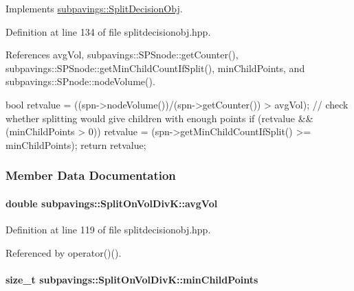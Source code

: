 \-Implements \hyperlink{classsubpavings_1_1SplitDecisionObj_aa1bd2caa4a7bc2890f0c7c7edc4ded4f}{subpavings\-::\-Split\-Decision\-Obj}.



\-Definition at line 134 of file splitdecisionobj.\-hpp.



\-References avg\-Vol, subpavings\-::\-S\-P\-Snode\-::get\-Counter(), subpavings\-::\-S\-P\-Snode\-::get\-Min\-Child\-Count\-If\-Split(), min\-Child\-Points, and subpavings\-::\-S\-Pnode\-::node\-Volume().


\begin{DoxyCode}
        {
            bool retvalue = ((spn->nodeVolume())/(spn->getCounter()) > avgVol);
            // check whether splitting would give children with enough points
            if (retvalue && (minChildPoints > 0)) {
                retvalue = (spn->getMinChildCountIfSplit() >= minChildPoints);
            }
            return retvalue;
        }
\end{DoxyCode}


\subsubsection{\-Member \-Data \-Documentation}
\hypertarget{classsubpavings_1_1SplitOnVolDivK_af1cbe104ee3bc6fd3598c511be389d85}{
\paragraph[{avg\-Vol}]{\setlength{\rightskip}{0pt plus 5cm}double {\bf subpavings\-::\-Split\-On\-Vol\-Div\-K\-::avg\-Vol}}}\label{classsubpavings_1_1SplitOnVolDivK_af1cbe104ee3bc6fd3598c511be389d85}


\-Definition at line 119 of file splitdecisionobj.\-hpp.



\-Referenced by operator()().

\hypertarget{classsubpavings_1_1SplitOnVolDivK_aa85a2b8c26238dc21866b947f1142d77}{
\paragraph[{min\-Child\-Points}]{\setlength{\rightskip}{0pt plus 5cm}size\-\_\-t {\bf subpavings\-::\-Split\-On\-Vol\-Div\-K\-::min\-Child\-Points}}}\label{classsubpavings_1_1SplitOnVolDivK_aa85a2b8c26238dc21866b947f1142d77}


